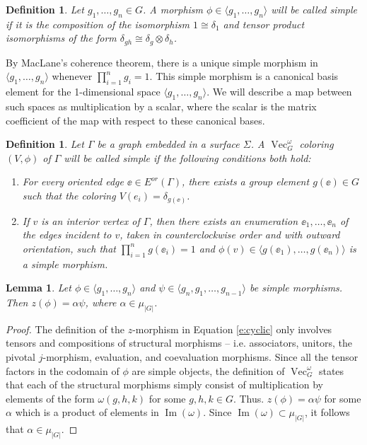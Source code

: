 \documentclass{ws-jktr}
\newtheorem{lem}[thm]{Lemma}
\newtheorem{defn}[thm]{Definition}
\DeclareMathOperator{\Vect}{Vec}
\DeclareMathOperator{\Img}{Im}
\newcommand{\one}{1}
\newcommand{\Si}{\Sigma}
\begin{document}
\begin{defn} \label{def:simple_morphism}
Let $g_1, \ldots, g_n \in G$.  A morphism $\phi \in \langle g_1, \ldots, g_n \rangle$ will be called \emph{simple} if it is the composition of the isomorphism $\one \cong \delta_1$ and  tensor product isomorphisms of the form $\delta_{gh} \cong \delta_g \otimes \delta_h$.
\end{defn}

By MacLane's coherence theorem, there is a unique simple morphism in $\langle g_1, \ldots, g_n \rangle$ whenever $\prod_{i=1}^n g_i = 1$. This simple morphism is a canonical basis element for the 1-dimensional space $\langle g_1, \ldots, g_n \rangle$.  We will describe a map between such spaces as multiplication by a scalar, where the scalar is the matrix coefficient of the map with respect to these canonical bases.

\begin{defn} \label{def:simple_graph}
Let $\Gamma$ be a graph embedded in a surface $\Si$.  A $\Vect_G^\omega$ coloring $(V, \phi)$ of $\Gamma$ will be called \emph{simple} if the following conditions both hold: 
\begin{enumerate}
\item For every oriented edge $\ee \in E^{or}(\Gamma)$, there exists a group element $g(\ee) \in G$ such that
the coloring $V(e_i) = \delta_{g(\ee)}$.
\item If $v$ is an interior vertex of $\Gamma$, then there exists an enumeration  $\ee_1, \dots, \ee_n$ of the edges incident to $v$, taken in counterclockwise order and with outward orientation, such that $\prod_{i=1}^n g(\ee_i) = 1$ and  $\phi(v) \in \langle g(\ee_1), \ldots, g(\ee_n) \rangle$ is a simple morphism.
\end{enumerate}
\end{defn}

\begin{lem} \label{lem:z_simple}
Let $\phi \in \langle g_1, \ldots, g_n \rangle$ and $\psi \in \langle g_n, g_1, \ldots, g_{n-1} \rangle$ be simple morphisms.  Then $z(\phi) = \alpha \psi$, where $\alpha \in \mu_{|G|}$.
\end{lem}
\begin{proof}
The definition of the $z$-morphism in Equation \ref{e:cyclic} only involves tensors and compositions of structural morphisms -- i.e. associators, unitors, the pivotal $j$-morphism, evaluation, and coevaluation morphisms.  Since all the tensor factors in the codomain of $\phi$ are simple objects, the definition of $\Vect_G^\omega$ states that each of the structural morphisms simply consist of multiplication by elements of the form $\omega(g,h,k)$ for some $g,h,k \in G$.  Thus. $z(\phi) = \alpha \psi$ for some $\alpha$ which is a product of elements in $\Img(\omega)$.   Since $\Img(\omega) \subset \mu_{|G|}$, it follows that $\alpha \in \mu_{|G|}$.
\end{proof}
\end{document}
